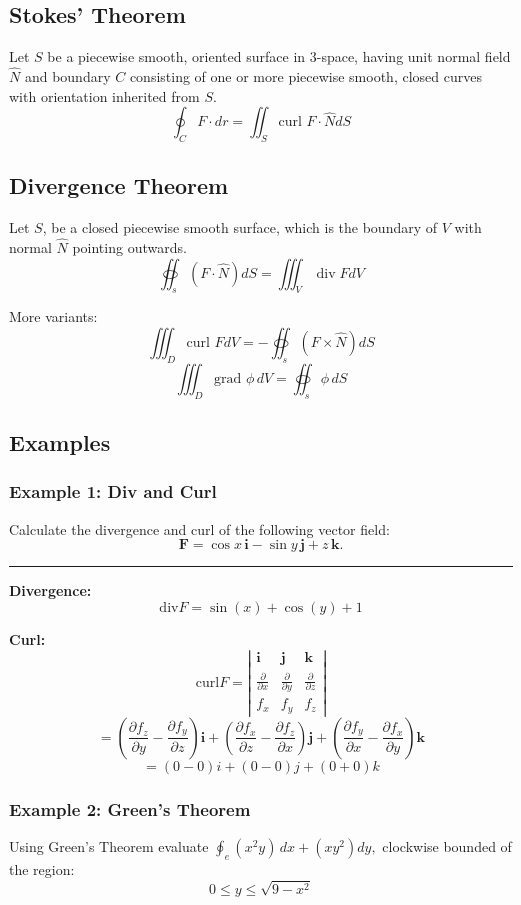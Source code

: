 \subsection{Stokes' Theorem}
Let $S$ be a piecewise smooth, oriented surface in 3-space, having unit normal field $\widehat{N}$ and boundary $C$ consisting of one or more piecewise smooth, closed curves with orientation inherited from $S$.
$$\oint_{C}F\cdot dr=\iint_{S}\text{curl }F\cdot\widehat{N}dS$$

\subsection{Divergence Theorem}
Let $S$, be a closed piecewise smooth surface, which is the boundary of $V$ with normal $\widehat{N}$ pointing outwards.
$$\oiint_{s}(F \cdot \widehat{N}) d S=\iiint_V \operatorname{div} F d V$$

More variants:
$$\iiint_{D}\text{curl }FdV=-\oiint_{s}(F \times\widehat{N})dS$$
$$\iiint_{D}\text{grad }\phi \,dV=\oiint_{s}\phi \,dS$$

\subsection{Examples}
\subsubsection{Example 1: Div and Curl}
Calculate the divergence and curl of the following vector field:
$$\mathbf{F}=\cos x\,\mathbf{i}-\sin y\,\mathbf{j}+z\,\mathbf{k}.$$

\rule{\textwidth}{1pt}

\textbf{Divergence:}
$$\text{div}F=\sin(x)+\cos(y)+1$$

\textbf{Curl:}
$$\text{curl}F=\left|\begin{array}{ccc}\mathbf{i} & \mathbf{j} & \mathbf{k} \\ \frac{ \partial  }{ \partial x } & \frac{ \partial  }{ \partial y } & \frac{ \partial  }{ \partial z } \\ f_{x} & f_{y} & f_{z} \end{array}\right|$$
$$=\left(\frac{ \partial f_{z} }{ \partial y } -\frac{ \partial f_{y} }{ \partial z } \right)\mathbf{i}+\left(\frac{ \partial f_{x} }{ \partial z } -\frac{ \partial f_{z} }{ \partial x } \right)\mathbf{j}+\left(\frac{ \partial f_{y} }{ \partial x } -\frac{ \partial f_{x} }{ \partial y } \right)\mathbf{k}$$
$$=(0-0)i+(0-0)j+(0+0)k$$
\subsubsection{Example 2: Green's Theorem}
Using Green's Theorem evaluate $\oint_{e}(x^{2}y)\,d x+(x y^{2})d y,$ clockwise bounded of the region:
$$0\leq y\leq{\sqrt{9-x^{2}}}$$

